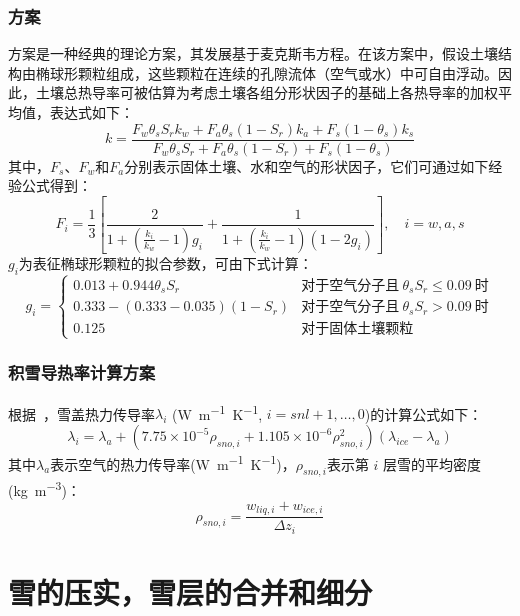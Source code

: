 \subsubsection{\citet{de1963thermal}方案}
\citet{de1963thermal}方案是一种经典的理论方案，其发展基于麦克斯韦方程。在该方案中，假设土壤结构由椭球形颗粒组成，这些颗粒在连续的孔隙流体（空气或水）中可自由浮动。因此，土壤总热导率可被估算为考虑土壤各组分形状因子的基础上各热导率的加权平均值，表达式如下：$$k=\frac{F_w\theta_sS_rk_w+F_a\theta_s\left(1-S_r\right)k_a+F_s\left(1-\theta_s\right)k_s}{F_w\theta_sS_r+F_a\theta_s\left(1-S_r\right)+F_s\left(1-\theta_s\right)}$$
其中，$F_s$、$F_w$和$F_a$分别表示固体土壤、水和空气的形状因子，它们可通过如下经验公式得到：
\begin{equation}
F_i=\frac{1}{3}\left[\frac{2}{1+\left(\frac{k_i}{k_w}-1\right)g_i}+\frac{1}{1+\left(\frac{k_i}{k_w}-1\right)(1-2g_i)}\right],\quad i=w,a,s
\end{equation}
$g_i$为表征椭球形颗粒的拟合参数，可由下式计算：
\begin{equation}
g_i=\begin{cases}
0.013+0.944\theta_sS_r  & \text{对于空气分子且}\ \theta_sS_r\leqslant 0.09\ \text{时} \\ 
0.333-\left(0.333-0.035\right)\left(1-S_r\right) & \text{对于空气分子且}\ \theta_sS_r>0.09\ \text{时} \\
0.125 &\text{对于固体土壤颗粒}
\end{cases}
\end{equation}


\subsubsection{积雪导热率计算方案}
根据~\citet{jordan1991one}，雪盖热力传导率$\lambda_i$ (\unit{W.m^{-1}.K^{-1}}, $i=snl+1,\ldots,0$)的计算公式如下：
\begin{equation}
\lambda_{i}=\lambda_{a}+\left(7.75 \times 10^{-5} \rho_{sno, i}+1.105 \times 10^{-6} \rho_{sno, i}^{2}\right)\left(\lambda_{ice}-\lambda_{a}\right)
\end{equation}
其中$\lambda_a$表示空气的热力传导率(\unit{W.m^{-1}.K^{-1}})，$\rho_{sno,i}$表示第 $i$ 层雪的平均密度(\unit{kg.m^{-3}})：
\begin{equation}
\rho_{sno, i}=\frac{w_{liq, i}+w_{ice, i}}{\Delta z_{i}}
\end{equation}

\section{雪的压实，雪层的合并和细分}



